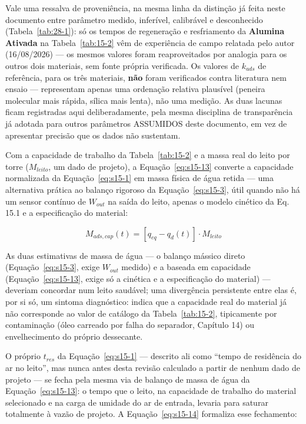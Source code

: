 \documentclass[12pt,a4paper]{article}
\numberwithin{equation}{section}
\numberwithin{table}{section}
\numberwithin{figure}{section}
\begin{document}
		Vale uma ressalva de proveniência, na mesma linha da distinção já feita neste documento entre parâmetro medido, inferível, calibrável e desconhecido (Tabela~\ref{tab:28-1}): só os tempos de regeneração e resfriamento da \textbf{Alumina Ativada} na Tabela~\ref{tab:15-2} vêm de experiência de campo relatada pelo autor (16/08/2026) — os mesmos valores foram reaproveitados por analogia para os outros dois materiais, sem fonte própria verificada. Os valores de $k_{ads}$ de referência, para os três materiais, \textbf{não} foram verificados contra literatura nem ensaio — representam apenas uma ordenação relativa plausível (peneira molecular mais rápida, sílica mais lenta), não uma medição. As duas lacunas ficam registradas aqui deliberadamente, pela mesma disciplina de transparência já adotada para outros parâmetros ASSUMIDOS deste documento, em vez de apresentar precisão que os dados não sustentam.

		Com a capacidade de trabalho da Tabela~\ref{tab:15-2} e a massa real do leito por torre ($M_{leito}$, um dado de projeto), a Equação~\eqref{eq:s15-13} converte a capacidade normalizada da Equação~\eqref{eq:s15-1} em massa física de água retida — uma alternativa prática ao balanço rigoroso da Equação~\eqref{eq:s15-3}, útil quando não há um sensor contínuo de $W_{out}$ na saída do leito, apenas o modelo cinético da Eq. 15.1 e a especificação do material:

		\begin{equation}\label{eq:s15-13}
		M_{ads,cap}(t) = \left[q_{eq} - q_d(t)\right] \cdot M_{leito}
		\end{equation}

		As duas estimativas de massa de água — o balanço mássico direto (Equação~\eqref{eq:s15-3}, exige $W_{out}$ medido) e a baseada em capacidade (Equação~\eqref{eq:s15-13}, exige só a cinética e a especificação do material) — deveriam concordar num leito saudável; uma divergência persistente entre elas é, por si só, um sintoma diagnóstico: indica que a capacidade real do material já não corresponde ao valor de catálogo da Tabela~\ref{tab:15-2}, tipicamente por contaminação (óleo carreado por falha do separador, Capítulo 14) ou envelhecimento do próprio dessecante.

		O próprio $t_{res}$ da Equação~\eqref{eq:s15-1} — descrito ali como ``tempo de residência do ar no leito'', mas nunca antes desta revisão calculado a partir de nenhum dado de projeto — se fecha pela mesma via de balanço de massa de água da Equação~\eqref{eq:s15-13}: o tempo que o leito, na capacidade de trabalho do material selecionado e na carga de umidade do ar de entrada, levaria para saturar totalmente à vazão de projeto. A Equação~\eqref{eq:s15-14} formaliza esse fechamento:
\end{document}
